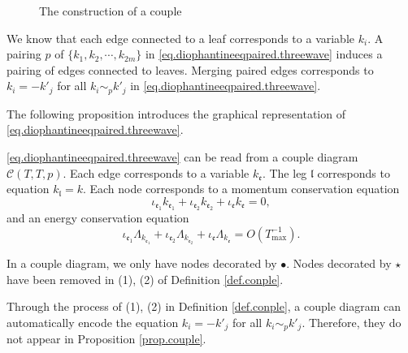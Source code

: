 \begin{defn}
\begin{enumerate}
\begin{figure}[H]
{
    }
        \caption{The construction of a couple}
        \label{fig.couple}
    \end{figure}
    
    We know that each edge connected to a leaf corresponds to a variable $k_i$. A pairing $p$ of $\{k_1,k_2,\cdots,k_{2m}\}$ in \eqref{eq.diophantineeqpaired.threewave} induces a pairing of edges connected to leaves. Merging paired edges corresponds to $k_{i}=-k'_{j}$ for all $k_{i}\sim_{p}k'_{j}$ in \eqref{eq.diophantineeqpaired.threewave}. 
\end{enumerate}
\end{defn}

The following proposition introduces the graphical representation of \eqref{eq.diophantineeqpaired.threewave}.

\begin{prop}\label{prop.couple}
\eqref{eq.diophantineeqpaired.threewave} can be read from a couple diagram $\mathcal{C}(T,T,p)$. Each edge corresponds to a variable $k_{\mathfrak{e}}$. The leg $\mathfrak{l}$ corresponds to equation $k_{\mathfrak{l}}=k$. Each node corresponds to a momentum conservation equation
\begin{equation}
    \iota_{\mathfrak{e}_1}k_{\mathfrak{e}_1}+\iota_{\mathfrak{e}_2}k_{\mathfrak{e}_2}+\iota_{\mathfrak{e}}k_{\mathfrak{e}}=0,
\end{equation} 
and an energy conservation equation \begin{equation}
    \iota_{\mathfrak{e}_1}\Lambda_{k_{\mathfrak{e}_1}}+\iota_{\mathfrak{e}_2}\Lambda_{k_{\mathfrak{e}_2}}+\iota_{\mathfrak{e}}\Lambda_{k_{\mathfrak{e}}} = O(T^{-1}_{\text{max}}).
\end{equation}  
\end{prop}
\begin{rem}
In a couple diagram, we only have nodes decorated by $\bullet$. Nodes decorated by $\star$ have been removed in (1), (2) of Definition \ref{def.conple}.
\end{rem}
\begin{rem}
Through the process of (1), (2) in Definition \ref{def.conple}, a couple diagram can automatically encode the equation $k_{i}=-k'_{j}$ for all $k_{i}\sim_{p}k'_{j}$. Therefore, they do not appear in Proposition \ref{prop.couple}.
\end{rem}


